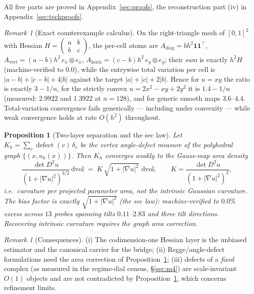 \documentclass[11pt,a4paper]{article}
\theoremstyle{plain}
\newtheorem{proposition}[theorem]{Proposition}
\theoremstyle{definition}
\theoremstyle{remark}
\newtheorem{remark}[theorem]{Remark}
\newcommand{\dvol}{\,\mathrm{dvol}}
\begin{document}
All five parts are proved in Appendix~\ref{sec:proofs}, the
reconstruction part (iv) in Appendix~\ref{sec:techproofs}.

\begin{remark}[Exact counterexample calculus]\label{rem:tvcounter}
On the right-triangle mesh of $[0,1]^2$ with Hessian
$H = \left(\begin{smallmatrix} a & b\\ b & c\end{smallmatrix}\right)$, the
per-cell atoms are $A_{\mathrm{diag}} = b h^2 \mathbf{1}\mathbf{1}^\top$,
$A_{\mathrm{vert}} = (a-b) h^2\, e_x \otimes e_x$,
$A_{\mathrm{horiz}} = (c-b) h^2\, e_y \otimes e_y$; their \emph{sum} is
exactly $h^2 H$ (machine-verified to $0.0$), while the entrywise total
variation per cell is $|a-b| + |c-b| + 4|b|$ against the target
$|a| + |c| + 2|b|$. Hence for $u = xy$ the ratio is exactly $3 - 1/n$, for
the strictly convex $u = 2x^2 - xy + 2y^2$ it is $1.4 - 1/n$ (measured:
$2.9922$ and $1.3922$ at $n=128$), and for generic smooth maps $3.6$--$4.4$.
Total-variation convergence fails generically --- including under
convexity --- while weak convergence holds at rate $O(h^2)$ throughout.
\end{remark}

\begin{proposition}[Two-layer separation and the sec law]
\label{prop:seclaw}
Let $K_h = \sum_v \operatorname{defect}(v)\,\delta_v$ be the vertex
angle-defect measure of the polyhedral graph
$\{(x, u_h(x))\}$. Then $K_h$ converges weakly to the \emph{Gauss-map area
density}
\[
\frac{\det D^2 u}{\left(1 + |\nabla u|^2\right)^{3/2}} \dvol
\;=\; K\,\sqrt{1+|\nabla u|^2}\,\dvol,
\qquad
K = \frac{\det D^2 u}{(1+|\nabla u|^2)^2},
\]
i.e.\ curvature per projected parameter area, \emph{not} the intrinsic
Gaussian curvature. The bias factor is exactly
$\sqrt{1+|\nabla u|^2}$ (the sec law): machine-verified to $0.0\%$ excess
across $13$ probes spanning tilts $0.11$--$2.83$ and three tilt
directions. Recovering intrinsic curvature requires the graph area
correction.
\end{proposition}

\begin{remark}[Consequences]
(i) The codimension-one Hessian layer is the unbiased estimator and the
canonical carrier for the bridge; (ii) Regge/angle-defect formulations
need the area correction of Proposition~\ref{prop:seclaw}; (iii) defects
of a \emph{fixed} complex (as measured in the regime-dial census, \S\ref{sec:m4}) are
scale-invariant $O(1)$ objects and are not contradicted by
Proposition~\ref{prop:seclaw}, which concerns refinement limits.
\end{remark}
\end{document}
